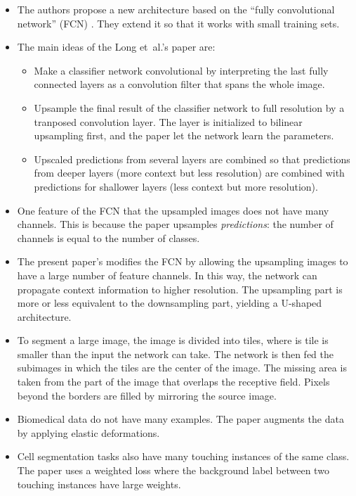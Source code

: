 \documentclass[10pt]{article}
\newcommand{\etal}{{et~al.}}
\begin{document}
\begin{itemize}
  	\item The authors propose a new architecture based on the ``fully convolutional network'' (FCN)  \cite{Long:2014}. They extend it so that it works with small training sets.

  	\item The main ideas of the Long \etal's paper are:
  	\begin{itemize}
  	 	\item Make a classifier network convolutional by interpreting the last fully connected layers as a convolution filter that spans the whole image.

  	 	\item Upsample the final result of the classifier network to full resolution by a tranposed convolution layer. The layer is initialized to bilinear upsampling first, and the paper let the network learn the parameters.

  	 	\item Upscaled predictions from several layers are combined so that predictions from deeper layers (more context but less resolution) are combined with predictions for shallower layers (less context but more resolution).
  	\end{itemize} 

  	\item One feature of the FCN that the upsampled images does not have many channels. This is because the paper upsamples \emph{predictions}: the number of channels is equal to the number of classes.

  	\item The present paper's modifies the FCN by allowing the upsampling images to have a large number of feature channels. In this way, the network can propagate context information to higher resolution. The upsampling part is more or less equivalent to the downsampling part, yielding a U-shaped architecture.

  	\item To segment a large image, the image is divided into tiles, where is tile is smaller than the input the network can take. The network is then fed the subimages in which the tiles are the center of the image. The missing area is taken from the part of the image that overlaps the receptive field. Pixels beyond the borders are filled by mirroring the source image.

  	\item Biomedical data do not have many examples. The paper augments the data by applying elastic deformations.

  	\item Cell segmentation tasks also have many touching instances of the same class. The paper uses a weighted loss where the background label between two touching instances have large weights.  	
  \end{itemize}
\end{document}
